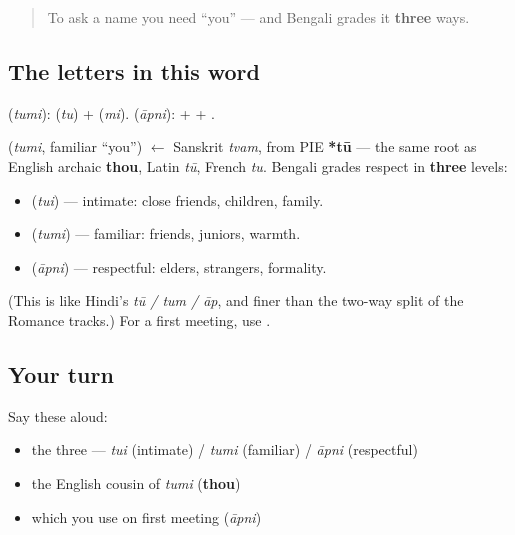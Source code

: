 \label{lesson:BN-C02-tumi-apni}



\begin{quote}
To ask a name you need \textquotedblleft{}you\textquotedblright{} — and Bengali grades it \textbf{three} ways.
\end{quote}

\subsection*{The letters in this word}
\textbf{} (\emph{tumi}): \textbf{} (\emph{tu}) + \textbf{} (\emph{mi}). \textbf{} (\emph{āpni}): \textbf{} + \textbf{} + \textbf{}.

\begin{cousinweb}
\textbf{} (\emph{tumi}, familiar \textquotedblleft{}you\textquotedblright{}) $\leftarrow$ Sanskrit \emph{tvam}, from PIE \textbf{*tū} — the same root as English archaic \textbf{thou}, Latin \emph{tū}, French \emph{tu}. Bengali grades respect in \textbf{three} levels:

\begin{itemize}
\raggedright
  \item \textbf{} (\emph{tui}) — intimate: close friends, children, family.
  \item \textbf{} (\emph{tumi}) — familiar: friends, juniors, warmth.
  \item \textbf{} (\emph{āpni}) — respectful: elders, strangers, formality.
\end{itemize}

(This is like Hindi's \emph{tū / tum / āp}, and finer than the two-way split of the Romance tracks.) For a first meeting, use \textbf{}.
\end{cousinweb}

\subsection*{Your turn}
Say these aloud:

\begin{itemize}
\raggedright
  \item the three — \emph{tui} (intimate) / \emph{tumi} (familiar) / \emph{āpni} (respectful)
  \item the English cousin of \emph{tumi} (\textbf{thou})
  \item which you use on first meeting (\emph{āpni})
\end{itemize}

